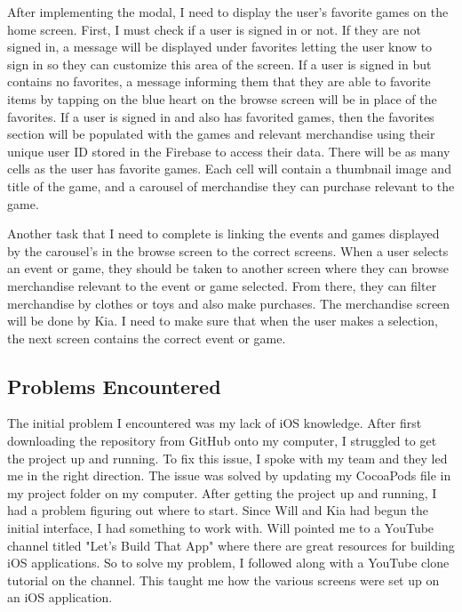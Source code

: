 \documentclass[onecolumn, draftclsnofoot,10pt, compsoc]{IEEEtran}
\begin{document}
\par After implementing the modal, I need to display the user’s favorite games on the home screen. First, I must check if a user is signed in or not. If they are not signed in, a message will be displayed under favorites letting the user know to sign in so they can customize this area of the screen. If a user is signed in but contains no favorites, a message informing them that they are able to favorite items by tapping on the blue heart on the browse screen will be in place of the favorites. If a user is signed in and also has favorited games, then the favorites section will be populated with the games and relevant merchandise using their unique user ID stored in the Firebase to access their data. There will be as many cells as the user has favorite games. Each cell will contain a thumbnail image and title of the game, and a carousel of merchandise they can purchase relevant to the game.

\par Another task that I need to complete is linking the events and games displayed by the carousel’s in the browse screen to the correct screens. When a user selects an event or game, they should be taken to another screen where they can browse merchandise relevant to the event or game selected. From there, they can filter merchandise by clothes or toys and also make purchases. The merchandise screen will be done by Kia. I need to make sure that when the user makes a selection, the next screen contains the correct event or game.

\subsection{Problems Encountered}
The initial problem I encountered was my lack of iOS knowledge. After first downloading the repository from GitHub onto my computer, I struggled to get the project up and running. To fix this issue, I spoke with my team and they led me in the right direction. The issue was solved by updating my CocoaPods file in my project folder on my computer. After getting the project up and running, I had a problem figuring out where to start. Since Will and Kia had begun the initial interface, I had something to work with. Will pointed me to a YouTube channel titled "Let's Build That App" where there are great resources for building iOS applications. So to solve my problem, I followed along with a YouTube clone tutorial on the channel. This taught me how the various screens were set up on an iOS application.
\end{document}
